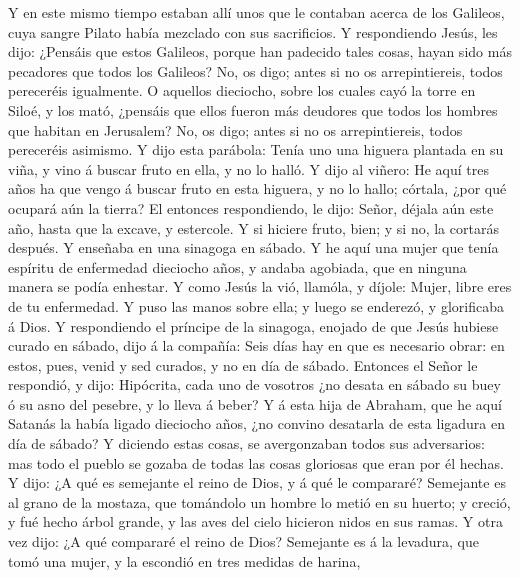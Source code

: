  Y en este mismo tiempo estaban allí unos que le contaban
acerca de los Galileos, cuya sangre Pilato había mezclado con sus
sacrificios.  Y respondiendo Jesús, les dijo: ¿Pensáis que
estos Galileos, porque han padecido tales cosas, hayan sido más
pecadores que todos los Galileos?  No, os digo; antes si no
os arrepintiereis, todos pereceréis igualmente.  O aquellos
dieciocho, sobre los cuales cayó la torre en Siloé, y los mató, ¿pensáis
que ellos fueron más deudores que todos los hombres que habitan en
Jerusalem?  No, os digo; antes si no os arrepintiereis,
todos pereceréis asimismo.  Y dijo esta parábola: Tenía uno
una higuera plantada en su viña, y vino á buscar fruto en ella, y no lo
halló.  Y dijo al viñero: He aquí tres años ha que vengo á
buscar fruto en esta higuera, y no lo hallo; córtala, ¿por qué ocupará
aún la tierra?  El entonces respondiendo, le dijo: Señor,
déjala aún este año, hasta que la excave, y estercole.  Y si
hiciere fruto, bien; y si no, la cortarás después.  Y
enseñaba en una sinagoga en sábado.  Y he aquí una mujer
que tenía espíritu de enfermedad dieciocho años, y andaba agobiada, que
en ninguna manera se podía enhestar.  Y como Jesús la vió,
llamóla, y díjole: Mujer, libre eres de tu enfermedad.  Y
puso las manos sobre ella; y luego se enderezó, y glorificaba á Dios.
 Y respondiendo el príncipe de la sinagoga, enojado de que
Jesús hubiese curado en sábado, dijo á la compañía: Seis días hay en que
es necesario obrar: en estos, pues, venid y sed curados, y no en día de
sábado.  Entonces el Señor le respondió, y dijo: Hipócrita,
cada uno de vosotros ¿no desata en sábado su buey ó su asno del pesebre,
y lo lleva á beber?  Y á esta hija de Abraham, que he aquí
Satanás la había ligado dieciocho años, ¿no convino desatarla de esta
ligadura en día de sábado?  Y diciendo estas cosas, se
avergonzaban todos sus adversarios: mas todo el pueblo se gozaba de
todas las cosas gloriosas que eran por él hechas.  Y dijo:
¿A qué es semejante el reino de Dios, y á qué le compararé?
 Semejante es al grano de la mostaza, que tomándolo un
hombre lo metió en su huerto; y creció, y fué hecho árbol grande, y las
aves del cielo hicieron nidos en sus ramas.  Y otra vez
dijo: ¿A qué compararé el reino de Dios?  Semejante es á la
levadura, que tomó una mujer, y la escondió en tres medidas de harina,
